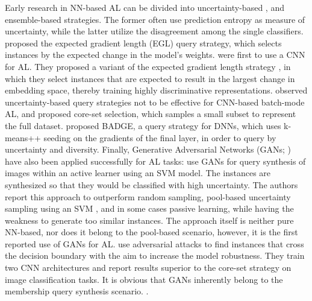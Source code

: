 Early research in NN-based AL can be divided into uncertainty-based ,
and ensemble-based  strategies.
The former often use prediction entropy  as measure of uncertainty,
while the latter utilize the disagreement among the single classifiers.
\textcite{settles2008multiple-instance} proposed the expected gradient length (EGL) query strategy, which selects instances by the  expected change in the model's weights. \textcite{zhang2017active} were first to use a CNN for AL.
They proposed a variant of the expected gradient length strategy , in which they select instances that are expected to result in the largest change in embedding space, thereby training highly discriminative representations.
\textcite{sener2017active} observed uncertainty-based query strategies not to be effective for CNN-based batch-mode AL, and proposed core-set selection, which samples a small subset to represent the full dataset. \textcite{ash2019deep} proposed BADGE, a query strategy for DNNs, which uses k-means++ seeding  on the gradients of the final layer, in order to query by uncertainty and diversity.
Finally, Generative Adversarial Networks (GANs; ) have also been applied successfully for AL tasks: 
\textcite{zhu2017generative} use GANs for query synthesis of images within an active learner using an SVM model.
The instances are synthesized so that they would be classified with high uncertainty. 
The authors report this approach to outperform random sampling, pool-based uncertainty sampling using an SVM , and in some cases passive learning, while having the weakness to generate too similar instances.
The approach itself is neither pure NN-based, nor does it belong to the pool-based scenario, however, it is the first reported use of GANs for AL.
\textcite{ducoffe2018adversarial} use adversarial attacks to find instances that cross the decision boundary with the aim to increase the model robustness.
They train two CNN architectures and report results superior to the core-set  strategy on image classification tasks.
It is obvious that GANs inherently belong to the membership query synthesis scenario.
.

